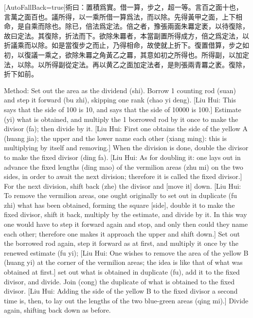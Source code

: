 \documentclass[11pt]{article}
\newcommand{\zhsmall}{\footnotesize\color{black!70}}
\newcommand{\unitlabel}[1]{\marginpar{\raggedleft\tiny\color{gray}#1}}
\newenvironment{unitzh}{\par\CJKfontspec{Noto Serif CJK SC}[AutoFallBack=true]\large\linespread{1.25}\selectfont}{\par}
\newenvironment{uniten}{\par\small\color{black!85}}{\par\medskip}
\begin{document}
\begin{unitzh}\unitlabel{jiuzhang-015.12}術曰：置積爲實。借一算，步之，超一等。{\zhsmall 言百之面十也，言萬之面百也。}議所得，以一乘所借一算爲法，而以除。{\zhsmall 先得黃甲之面，上下相命，是自乘而除也。}除已，倍法爲定法。{\zhsmall 倍之者，豫張兩面朱羃定袤，以待復除，故曰定法。}其復除，折法而下。{\zhsmall 欲除朱羃者，本當副置所得成方，倍之爲定法，以折議乘而以除。如是當復步之而止，乃得相命，故使就上折下。}復置借算，步之如初，以復議一乘之，{\zhsmall 欲除朱羃之角黃乙之羃，其意如初之所得也。}所得副，以加定法，以除。以所得副從定法。{\zhsmall 再以黄乙之面加定法者，是則張兩青羃之袤。}復除，折下如前。\end{unitzh}
\begin{uniten}Method: Set out the area as the dividend (shi). Borrow 1 counting rod (suan) and step it forward (bu zhi), skipping one rank (chao yi deng). [Liu Hui: This says that the side of 100 is 10, and says that the side of 10000 is 100.] Estimate (yi) what is obtained, and multiply the 1 borrowed rod by it once to make the divisor (fa); then divide by it. [Liu Hui: First one obtains the side of the yellow A (huang jia); the upper and the lower name each other (xiang ming): this is multiplying by itself and removing.] When the division is done, double the divisor to make the fixed divisor (ding fa). [Liu Hui: As for doubling it: one lays out in advance the fixed lengths (ding mao) of the vermilion areas (zhu mi) on the two sides, in order to await the next division; therefore it is called the fixed divisor.] For the next division, shift back (zhe) the divisor and [move it] down. [Liu Hui: To remove the vermilion areas, one ought originally to set out in duplicate (fu zhi) what has been obtained, forming the square [side], double it to make the fixed divisor, shift it back, multiply by the estimate, and divide by it. In this way one would have to step it forward again and stop, and only then could they name each other; therefore one makes it approach the upper and shift down.] Set out the borrowed rod again, step it forward as at first, and multiply it once by the renewed estimate (fu yi); [Liu Hui: One wishes to remove the area of the yellow B (huang yi) at the corner of the vermilion areas; the idea is like that of what was obtained at first.] set out what is obtained in duplicate (fu), add it to the fixed divisor, and divide. Join (cong) the duplicate of what is obtained to the fixed divisor. [Liu Hui: Adding the side of the yellow B to the fixed divisor a second time is, then, to lay out the lengths of the two blue-green areas (qing mi).] Divide again, shifting back down as before.\end{uniten}
\end{document}
